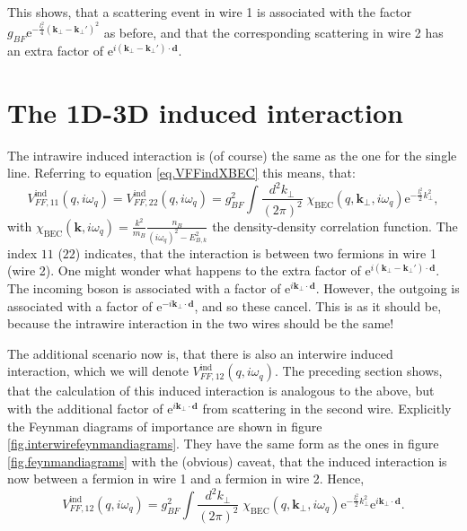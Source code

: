 This shows, that a scattering event in wire 1 is associated with the factor $g_{BF} \text{e}^{-\frac{l_t^2}{4}(\mathbf{k}_\perp - \mathbf{k}_\perp')^2}$ as before, and that the corresponding scattering in wire 2 has an extra factor of $\text{e}^{i(\mathbf{k}_\perp - \mathbf{k}_\perp')\cdot \mathbf{d}}$. 

\section{The 1D-3D induced interaction}
The intrawire induced interaction is (of course) the same as the one for the single line. Referring to equation \ref{eq.VFFindXBEC} this means, that:
\begin{equation}
V_{FF,11}^\text{ind}(q,i\omega_q) = V_{FF,22}^\text{ind}(q,i\omega_q) = g_{BF}^2\int\frac{d^2k_\perp}{(2\pi)^2}\; \chi_\text{BEC}(q,\mathbf{k}_\perp,i\omega_q)\text{e}^{-\frac{l_t^2}{2}k_\perp^2}, 
\label{eq.VFF1122indXBEC} 
\end{equation}
with $\chi_\text{BEC}(\mathbf{k},i\omega_q) = \frac{k^2}{m_B}\frac{n_B}{(i\omega_q)^2-E_{B,k}^2}$ the density-density correlation function. The index $11$ ($22$) indicates, that the interaction is between two fermions in wire 1 (wire 2). One might wonder what happens to the extra factor of $\text{e}^{i(\mathbf{k}_\perp - \mathbf{k}_\perp')\cdot \mathbf{d}}$. The incoming boson is associated with a factor of $\text{e}^{i\mathbf{k}_\perp\cdot \mathbf{d}}$. However, the outgoing is associated with a factor of $\text{e}^{-i\mathbf{k}_\perp\cdot \mathbf{d}}$, and so these cancel. This is as it should be, because the intrawire interaction in the two wires should be the same!

The additional scenario now is, that there is also an interwire induced interaction, which we will denote $V_{FF,12}^\text{ind}(q,i\omega_q)$. The preceding section shows, that the calculation of this induced interaction is analogous to the above, but with the additional factor of $\text{e}^{i\mathbf{k}_\perp\cdot \mathbf{d}}$ from scattering in the second wire. Explicitly the Feynman diagrams of importance are shown in figure \ref{fig.interwirefeynmandiagrams}. They have the same form as the ones in figure \ref{fig.feynmandiagrams} with the (obvious) caveat, that the induced interaction is now between a fermion in wire 1 and a fermion in wire 2. Hence,
\begin{equation}
V_{FF,12}^\text{ind}(q,i\omega_q) = g_{BF}^2\int\frac{d^2k_\perp}{(2\pi)^2}\; \chi_\text{BEC}(q,\mathbf{k}_\perp,i\omega_q)\text{e}^{-\frac{l_t^2}{2}k_\perp^2}\text{e}^{i\mathbf{k}_\perp\cdot \mathbf{d}}. 
\label{eq.VFF12indXBEC} 
\end{equation}

